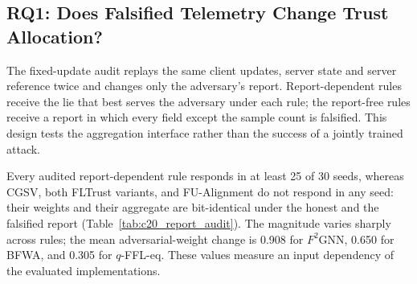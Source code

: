 \begin{table}[t]
\centering
\scriptsize
\caption{\textbf{Evaluation protocol.} Each study answers one research question with its own federation size and number of rounds $R$; results are compared only within a study. $K$ is the number of clients and $f$ the number of adversaries. The last column gives the identifier of the corresponding artifact in the code repository.}
\label{tab:protocol}
\setlength{\tabcolsep}{3pt}
\end{table}

\subsection{RQ1: Does Falsified Telemetry Change Trust Allocation?}
\label{subsec:rq1_audit}

The fixed-update audit replays the same client updates, server state and server reference twice and changes only the adversary's report. Report-dependent rules receive the lie that best serves the adversary under each rule; the report-free rules receive a report in which every field except the sample count is falsified. This design tests the aggregation interface rather than the success of a jointly trained attack.



Every audited report-dependent rule responds in at least 25 of 30 seeds, whereas CGSV, both FLTrust variants, and FU-Alignment do not respond in any seed: their weights and their aggregate are bit-identical under the honest and the falsified report (Table~\ref{tab:c20_report_audit}). The magnitude varies sharply across rules; the mean adversarial-weight change is 0.908 for $F^2$GNN, 0.650 for BFWA, and 0.305 for $q$-FFL-eq. These values measure an input dependency of the evaluated implementations.


